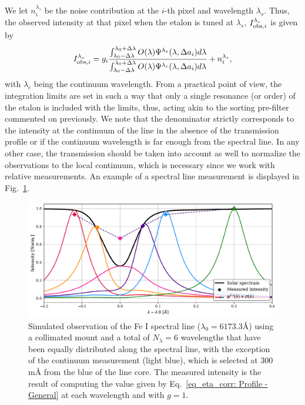 We let $n _ i ^{\lambda_s}$ be the  noise contribution at the $i$-th pixel and wavelength $\lambda_s$. Thus, the observed intensity at that pixel when the etalon is tuned at $\lambda _s$, $I ^{\lambda _ s} _ {{\rm obs}, i}$ is given by 
\begin{equation}
I ^{\lambda _ s} _ {{\rm obs}, i} = g_i \frac{\int_{\lambda_0 - \Delta \lambda}^{\lambda_0 + \Delta \lambda} O(\lambda)\Psi^{\lambda _ s} (\lambda , \Delta a _i)  d\lambda}{\int_{\lambda_0 - \Delta \lambda}^{\lambda_0 + \Delta \lambda} O(\lambda)\Psi^{\lambda _ c} (\lambda, \Delta a _ i)  d\lambda} + n _ i ^{\lambda_s}    ,
\label{eq_eta_corr: Profile - General}
\end{equation}
with $\lambda _ c$ being the continuum wavelength. From a practical point of view, the integration limits are set in such a way that only a single resonance (or order) of the etalon is included with the limits, thus, acting akin to the sorting pre-filter commented on previously. We note that the denominator strictly corresponds to the intensity at the continuum of the line in the absence of the transmission profile or if the continuum wavelength is far enough from the spectral line. In any other case, the transmission should be taken into account as well to normalize the observations to the local continuum, which is necessary since we work with relative measurements. An example of a spectral line measurement is displayed in Fig.~\ref{fig_etalon_corr: Prof-Measure}.
\begin{figure}
    \centering
    \includegraphics[width = \textwidth]{figures/EtalonPaper/ProfileMeasurement.pdf}
    \caption{Simulated observation of the Fe I spectral line ($\lambda _ 0 = 6173.3$\r{A}) using a collimated mount and a total of $N_ \lambda = 6$ wavelengths that have been equally distributed along the spectral line, with the exception of the continuum measurement (light blue), which is selected at $300$ m\r{A} from the blue of the line core. The measured intensity is the result of computing the value given by Eq.~\ref{eq_eta_corr: Profile - General} at each wavelength and with $g = 1$.
    } \label{fig_etalon_corr: Prof-Measure}
\end{figure}

